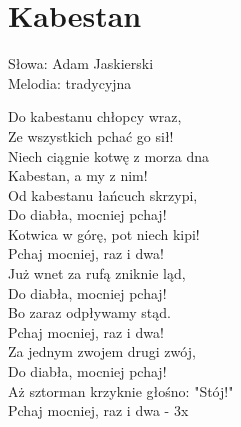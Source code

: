 \section{Kabestan}
Słowa: Adam Jaskierski\\
Melodia: tradycyjna

\vspace{2em}
Do kabestanu chłopcy wraz, \\
Ze wszystkich pchać go sił! \\
Niech ciągnie kotwę z morza dna \\
Kabestan, a my z nim! \\


Od kabestanu łańcuch skrzypi, \\
Do diabła, mocniej pchaj! \\
Kotwica w górę, pot niech kipi! \\
Pchaj mocniej, raz i dwa! \\


Już wnet za rufą zniknie ląd, \\
Do diabła, mocniej pchaj! \\
Bo zaraz odpływamy stąd. \\
Pchaj mocniej, raz i dwa! \\


Za jednym zwojem drugi zwój, \\
Do diabła, mocniej pchaj! \\
Aż sztorman krzyknie głośno: "Stój!" \\
Pchaj mocniej, raz i dwa - 3x